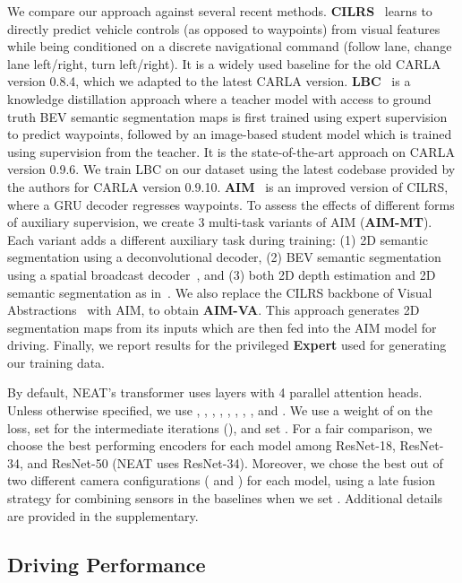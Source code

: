 We compare our approach against several recent methods. \textbf{CILRS}~\cite{Codevilla2019ICCV} learns to directly predict vehicle controls (as opposed to waypoints) from visual features while being conditioned on a discrete navigational command (follow lane, change lane left/right, turn left/right). It is a widely used baseline for the old CARLA version 0.8.4, which we adapted to the latest CARLA version. \textbf{LBC}~\cite{Chen2019CORL} is a knowledge distillation approach where a teacher model with access to ground truth BEV semantic segmentation maps is first trained using expert supervision to predict waypoints, followed by an image-based student model which is trained using supervision from the teacher. It is the state-of-the-art approach on CARLA version 0.9.6. We train LBC on our dataset using the latest codebase provided by the authors for CARLA version 0.9.10. \textbf{AIM}~\cite{Prakash2021CVPR} is an improved version of CILRS, where a GRU decoder regresses waypoints. To assess the effects of different forms of auxiliary supervision, we create 3 multi-task variants of AIM (\textbf{AIM-MT}). Each variant adds a different auxiliary task during training: (1) 2D semantic segmentation using a deconvolutional decoder, (2) BEV semantic segmentation using a spatial broadcast decoder~\cite{Watters2019ICLRWORK}, and (3) both 2D depth estimation and 2D semantic segmentation as in~\cite{Li2018ARXIV}. We also replace the CILRS backbone of Visual Abstractions~\cite{Behl2020IROS} with AIM, to obtain \textbf{AIM-VA}. This approach generates 2D segmentation maps from its inputs which are then fed into the AIM model for driving. Finally, we report results for the privileged \textbf{Expert} used for generating our training data.

 By default, NEAT's transformer uses  layers with 4 parallel attention heads. Unless otherwise specified, we use , , , , , , , ,  and . We use a weight of  on the  loss, set  for the intermediate iterations (), and set . For a fair comparison, we choose the best performing encoders for each model among ResNet-18, ResNet-34, and ResNet-50 (NEAT uses ResNet-34). Moreover, we chose the best out of two different camera configurations ( and ) for each model, using a late fusion strategy for combining sensors in the baselines when we set . Additional details are provided in the supplementary.

\subsection{Driving Performance}

